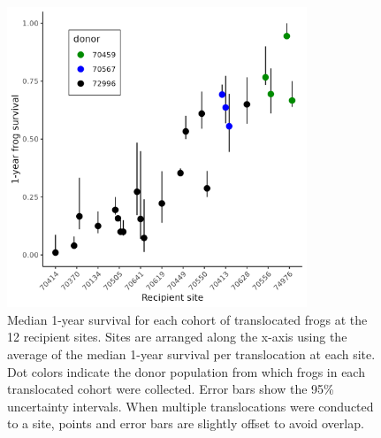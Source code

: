 \documentclass[9pt,twocolumn,twoside,lineno]{pnas-new}
\begin{document}
\begin{figure}

{\centering \includegraphics[width=0.8\textwidth]{figures/translocation_survival_bysiteid.png}

}

\caption{\label{fig-translocation-survival}Median 1-year survival for
each cohort of translocated frogs at the 12 recipient sites. Sites are
arranged along the x-axis using the average of the median 1-year
survival per translocation at each site. Dot colors indicate the donor
population from which frogs in each translocated cohort were collected.
Error bars show the 95\% uncertainty intervals. When multiple
translocations were conducted to a site, points and error bars are
slightly offset to avoid overlap.}

\end{figure}

\newpage
\end{document}
